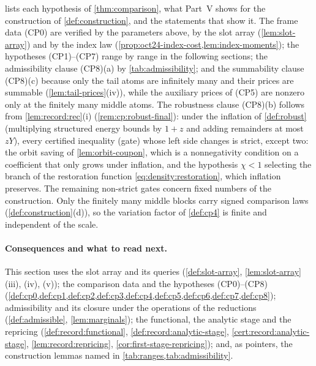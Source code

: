  lists each hypothesis of \cref{thm:comparison}, what
Part~V shows for the construction of \cref{def:construction}, and the statements
that show it. The frame data (CP0) are verified by the parameters above, by the
slot array (\cref{lem:slot-array}) and by the index law
(\cref{prop:oct24-index-cost,lem:index-moments}); the hypotheses (CP1)--(CP7)
range by range in the following sections; the admissibility clause (CP8)(a) by
\cref{tab:admissibility}; and the summability clause (CP8)(c) because only the
tail atoms are infinitely many and their prices are summable
(\cref{lem:tail-prices}(iv)), while the auxiliary prices of (CP5) are nonzero
only at the finitely many middle atoms. The robustness clause (CP8)(b) follows
from \cref{lem:record:rec}(i) (\cref{rem:cp:robust-final}):
under the inflation of \cref{def:robust} (multiplying structured
energy bounds by $1+z$ and adding remainders at most $zY$), every
certified inequality (gate) whose left side changes is strict,
except two: the orbit saving of
\cref{lem:orbit-coupon}, which is a nonnegativity condition on a
coefficient that only grows under inflation, and the hypothesis
$\chi<1$ selecting the branch of the restoration function
\eqref{eq:density:restoration}, which inflation preserves. The
remaining non-strict gates concern fixed numbers of the
construction. Only the
finitely many middle blocks carry signed comparison laws
(\cref{def:construction}(d)), so the variation factor of \cref{def:cp4} is
finite and independent of the scale.

\paragraph{Consequences and what to read next.}
This section uses the slot array and its queries (\cref{def:slot-array},
\cref{lem:slot-array}(iii),
(iv), (v)); the comparison data and the hypotheses (CP0)--(CP8)
(\cref{def:cp0,def:cp1,def:cp2,def:cp3,def:cp4,def:cp5,def:cp6,def:cp7,def:cp8});
admissibility and its closure under the operations of the reductions
(\cref{def:admissible}, \cref{lem:marginals}); the functional, the analytic stage
and the repricing (\cref{def:record:functional}, \cref{def:record:analytic-stage},
\cref{cert:record:analytic-stage}, \cref{lem:record:repricing},
\cref{cor:first-stage-repricing}); and, as pointers, the construction lemmas named
in \cref{tab:ranges,tab:admissibility}.

